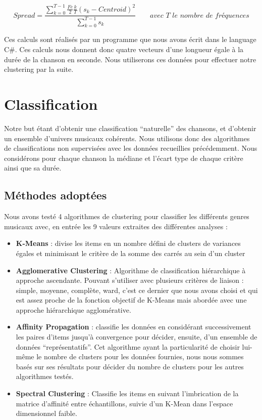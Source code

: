 \documentclass{ir}
\begin{document}
\begin{equation}
    Spread = \frac{ \sum_{k = 0}^{T-1} \frac{Fe}{2} \frac{k}{T} (s_k - Centroid)^2}{\sum_{k=0}^{T-1} s_k}
    \qquad \textit{avec T le nombre de fréquences}
\end{equation}

Ces calculs sont réalisés par un programme que nous avons écrit dans le language C\#. Ces calculs nous donnent 
donc quatre vecteurs d’une longueur égale à la durée de la chanson en seconde. Nous utiliserons ces données 
pour effectuer notre clustering par la suite.

\section{Classification}
Notre but étant d’obtenir une classification “naturelle” des chansons, et d’obtenir un ensemble d’univers 
musicaux cohérents. Nous utilisons donc des algorithmes de classifications non supervisées avec les données 
recueillies précédemment. Nous considérons pour chaque chanson la médiane et l’écart type de chaque critère
ainsi que sa durée.

\subsection{Méthodes adoptées}
Nous avons testé 4 algorithmes de clustering pour classifier les différents genres musicaux avec, en entrée 
les 9 valeurs extraites des différentes analyses :
\begin{itemize}
    \item{\textbf{K-Means} : divise les items en un nombre défini de clusters de variances égales et minimisant le 
    critère de la somme des carrés au sein d’un cluster}
    \item {\textbf{Agglomerative Clustering} : Algorithme de classification hiérarchique à approche ascendante. 
    Pouvant s’utiliser avec plusieurs critères de liaison : simple, moyenne, complète, ward, c’est ce dernier 
    que nous avons choisi et qui est assez proche de la fonction objectif de K-Means mais abordée avec une 
    approche hiérarchique agglomérative.}
    \item{\textbf{Affinity Propagation} : classifie les données en considérant successivement les paires d’items jusqu’à 
    convergence pour décider, ensuite, d’un ensemble de données “représentatifs”. Cet algorithme ayant la 
    particularité de choisir lui-même le nombre de clusters pour les données fournies, nous nous sommes basés 
    sur ses résultats pour décider du nombre de clusters pour les autres algorithmes testés.}
    \item{\textbf{Spectral Clustering} : Classifie les items en suivant l’imbrication de la matrice d’affinité entre 
    échantillons, suivie d’un K-Mean dans l’espace dimensionnel faible.}
\end{itemize}
\end{document}
